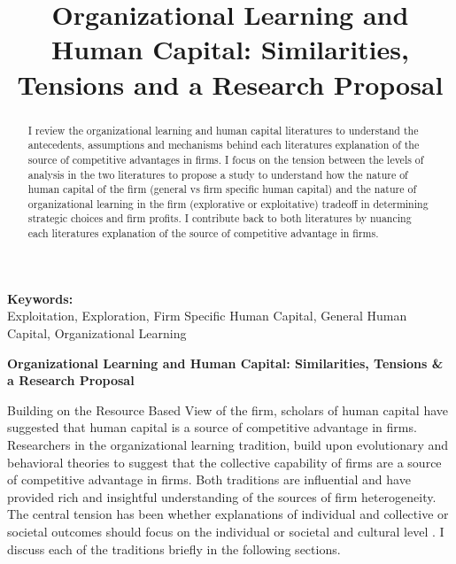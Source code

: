 \documentclass[12pt,letterpaper]{article}
\begin{document}
\title{Organizational Learning and Human Capital: Similarities, Tensions and a Research Proposal}
\date{}
\maketitle

\begin{abstract} 
\normalsize 
I review the organizational learning and human capital literatures to understand the antecedents, assumptions and mechanisms behind each literature\textquotesingle s explanation of the source of competitive advantages in firms. I focus on the tension between the levels of analysis in the two literatures to propose a study to understand how the nature of human capital of the firm (general vs firm specific human capital) and the nature of organizational learning  in the firm (explorative or exploitative) tradeoff in determining strategic choices and firm profits. I contribute back to both literatures by nuancing each literature\textquotesingle s explanation of the source of competitive advantage in firms.
\end{abstract}


{\textbf{Keywords:} \\\indent Exploitation, Exploration, Firm Specific Human Capital, General Human Capital,  Organizational Learning}

\newpage
\pagestyle{fancy}
\fancyhf{}
\rhead{\thepage}

\begin{center}
\textbf{Organizational Learning and Human Capital: Similarities, Tensions \& a Research Proposal}
\end{center}

Building on the Resource Based View \citep{Barney1991} of the firm, scholars of human capital have suggested that human capital is a source of competitive advantage in firms. Researchers in the organizational learning tradition, build upon evolutionary \citep{Nelson1982} and behavioral theories \citep{Cyert1963, March1958} to suggest that the collective capability of firms are a source of competitive advantage in firms. Both traditions are influential and have provided rich and insightful understanding of the sources of firm heterogeneity. The central tension has been whether explanations of individual and collective or societal outcomes should focus on the individual or societal and cultural level \citep{Udehn2001}. I discuss each of the traditions briefly in the following sections.
\end{document}
